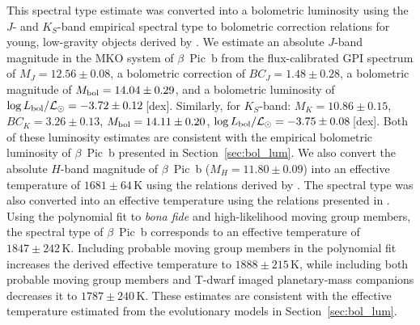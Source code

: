 \documentclass[twocolumn]{aastex6}
\begin{document}
This spectral type estimate was converted into a bolometric luminosity using the $J$- and $K_S$-band empirical spectral type to bolometric correction relations for young, low-gravity objects derived by \citet{2015ApJ...810..158F}. We estimate an absolute $J$-band magnitude in the MKO system \citep{2002PASP..114..180T} of $\beta$~Pic~b from the flux-calibrated GPI spectrum of $M_J=12.56 \pm 0.08$, a bolometric correction of $BC_J = 1.48\pm0.28$, a bolometric magnitude of $M_{\rm bol}=14.04\pm0.29$, and a bolometric luminosity of $\log L_{\rm bol}/{\mathcal L}_{\odot} = -3.72\pm0.12$\,[dex]. Similarly, for $K_S$-band: $M_K = 10.86\pm0.15$, $BC_K = 3.26\pm0.13$, $M_{\rm bol}=14.11\pm0.20$, $\log L_{\rm bol}/{\mathcal L}_{\odot} = -3.75\pm0.08$\,[dex]. Both of these luminosity estimates are consistent with the empirical bolometric luminosity of $\beta$~Pic~b presented in Section~\ref{sec:bol_lum}. We also convert the absolute $H$-band magnitude of $\beta$~Pic~b ($M_H = 11.80\pm0.09$) into an effective temperature of $1681\pm64$\,K using the relations derived by \citet{2015ApJ...810..158F}. The spectral type was also converted into an effective temperature using the relations presented in \citet{Faherty:2016fx}. Using the polynomial fit to {\it bona fide} and high-likelihood moving group members, the spectral type of $\beta$~Pic~b corresponds to an effective temperature of $1847\pm242$\,K. Including probable moving group members in the polynomial fit increases the derived effective temperature to $1888\pm215$\,K, while including both probable moving group members and T-dwarf imaged planetary-mass companions decreases it to $1787\pm240$\,K. These estimates are consistent with the effective temperature estimated from the evolutionary models in Section~\ref{sec:bol_lum}.
\end{document}
